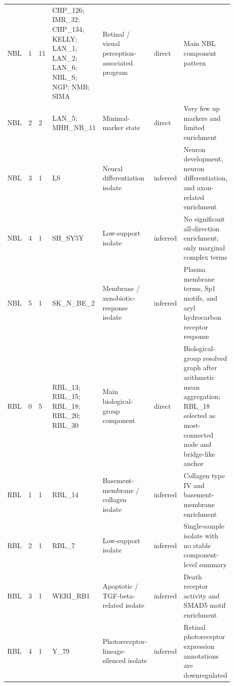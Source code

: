 \begin{landscape}
{\begin{longtable}{p{0.06\linewidth}p{0.07\linewidth}p{0.05\linewidth}p{0.22\linewidth}p{0.14\linewidth}p{0.08\linewidth}p{0.30\linewidth}}
NBL & 1 & 11 & CHP\_\allowbreak{}126; IMR\_\allowbreak{}32; CHP\_\allowbreak{}134; KELLY; LAN\_\allowbreak{}1; LAN\_\allowbreak{}2; LAN\_\allowbreak{}6; NBL\_\allowbreak{}S; NGP; NMB; SIMA & Retinal / visual perception-associated program & direct & Main NBL component pattern \\
NBL & 2 & 2 & LAN\_\allowbreak{}5; MHH\_\allowbreak{}NB\_\allowbreak{}11 & Minimal-marker state & direct & Very few up markers and limited enrichment \\
NBL & 3 & 1 & LS & Neural differentiation isolate & inferred & Neuron development, neuron differentiation, and axon-related enrichment \\
NBL & 4 & 1 & SH\_\allowbreak{}SY5Y & Low-support isolate & inferred & No significant all-direction enrichment; only marginal complex terms \\
NBL & 5 & 1 & SK\_\allowbreak{}N\_\allowbreak{}BE\_\allowbreak{}2 & Membrane / xenobiotic-response isolate & inferred & Plasma membrane terms, Sp1 motifs, and aryl hydrocarbon receptor response \\
RBL & 0 & 5 & RBL\_\allowbreak{}13; RBL\_\allowbreak{}15; RBL\_\allowbreak{}18; RBL\_\allowbreak{}20; RBL\_\allowbreak{}30 & Main biological-group component & direct & Biological-group resolved graph after arithmetic mean aggregation; RBL\_\allowbreak{}18 selected as most-connected node and bridge-like anchor \\
RBL & 1 & 1 & RBL\_\allowbreak{}14 & Basement-membrane / collagen isolate & inferred & Collagen type IV and basement-membrane enrichment \\
RBL & 2 & 1 & RBL\_\allowbreak{}7 & Low-support isolate & inferred & Single-sample isolate with no stable component-level summary \\
RBL & 3 & 1 & WERI\_\allowbreak{}RB1 & Apoptotic / TGF-beta-related isolate & inferred & Death receptor activity and SMAD5 motif enrichment \\
RBL & 4 & 1 & Y\_\allowbreak{}79 & Photoreceptor-lineage-silenced isolate & inferred & Retinal photoreceptor expression annotations are downregulated \\
\end{longtable}
}
\end{landscape}

